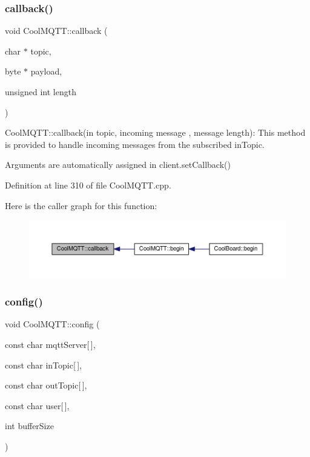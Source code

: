 \subsubsection{\texorpdfstring{callback()}{callback()}}
{\footnotesize\ttfamily void Cool\+M\+Q\+T\+T\+::callback (\begin{DoxyParamCaption}\item[{char $\ast$}]{topic,  }\item[{byte $\ast$}]{payload,  }\item[{unsigned int}]{length }\end{DoxyParamCaption})}

Cool\+M\+Q\+T\+T\+::callback(in topic, incoming message , message length)\+: This method is provided to handle incoming messages from the subscribed in\+Topic.

Arguments are automatically assigned in client.\+set\+Callback() 

Definition at line 310 of file Cool\+M\+Q\+T\+T.\+cpp.

Here is the caller graph for this function\+:\nopagebreak
\begin{figure}[H]
\begin{center}
\leavevmode
\includegraphics[width=350pt]{class_cool_m_q_t_t_a30d82ad665bfb603f46ecdbc290775df_icgraph}
\end{center}
\end{figure}
\mbox{\label{class_cool_m_q_t_t_a9b703de4f1358f0ee7a5e8c44979c648}} 
\subsubsection{\texorpdfstring{config()}{config()}\hspace{0.1cm}{\footnotesize\ttfamily [1/2]}}
{\footnotesize\ttfamily void Cool\+M\+Q\+T\+T\+::config (\begin{DoxyParamCaption}\item[{const char}]{mqtt\+Server\mbox{[}$\,$\mbox{]},  }\item[{const char}]{in\+Topic\mbox{[}$\,$\mbox{]},  }\item[{const char}]{out\+Topic\mbox{[}$\,$\mbox{]},  }\item[{const char}]{user\mbox{[}$\,$\mbox{]},  }\item[{int}]{buffer\+Size }\end{DoxyParamCaption})}

